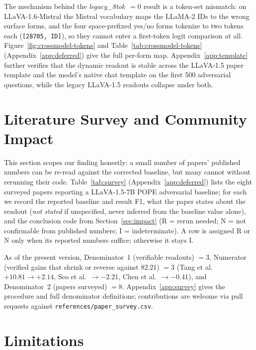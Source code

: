 \documentclass{article}
\begin{document}
The mechanism behind the \emph{legacy\_8tok}~$=0$ result is a token-set
mismatch: on LLaVA-1.6-Mistral the Mistral vocabulary maps the LLaMA-2
IDs to the wrong surface forms, and the four space-prefixed yes/no forms
tokenize to two tokens each (\texttt{[28705, ID]}), so they cannot enter
a first-token logit comparison at all. Figure~\ref{fig:crossmodel-tokens}
and Table~\ref{tab:crossmodel-tokens} (Appendix~\ref{app:deferred}) give
the full per-form map. Appendix~\ref{app:template} further verifies that
the dynamic readout is stable across the LLaVA-1.5 paper template and the
model's native chat template on the first 500 adversarial questions,
while the legacy LLaVA-1.5 readouts collapse under both.

\section{Literature Survey and Community Impact}
\label{sec:survey}

This section scopes our finding honestly: a small number of papers'
published numbers can be re-read against the corrected baseline, but
many cannot without rerunning their code. Table~\ref{tab:survey}
(Appendix~\ref{app:deferred}) lists the eight surveyed papers reporting a
LLaVA-1.5-7B POPE adversarial baseline; for each we record the reported
baseline and result F1, what the paper states about the readout
(\emph{not stated} if unspecified, never inferred from the baseline
value alone), and the conclusion code from Section~\ref{sec:impact}
(R = rerun needed; N = not confirmable from published numbers;
I = indeterminate). A row is assigned R or N only when its reported
numbers suffice; otherwise it stays I.

As of the present version, Denominator~1 (verifiable readouts) $=3$,
Numerator (verified gains that shrink or reverse against 82.21) $=3$
(Tang et al.\ $+10.81 \to +2.14$, Seo et al.\ $\to -2.21$, Chen et al.\
$\to -0.41$), and Denominator~2 (papers surveyed) $=8$.
Appendix~\ref{app:survey} gives the procedure and full denominator
definitions; contributions are welcome via pull requests against
\texttt{references/paper\_survey.csv}.

\section{Limitations}
\label{sec:limitations}
\end{document}
